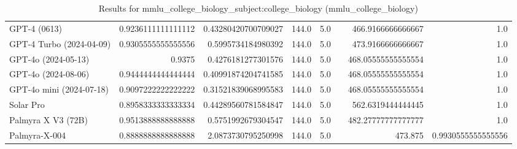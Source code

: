 \begin{table}[htp]
{\begin{tabular}{lrrrrrrr}
GPT-4 (0613) & 0.9236111111111112 & 0.43280420700709027 & 144.0 & 5.0 &  & 466.9166666666667 & 1.0 \\
GPT-4 Turbo (2024-04-09) & 0.9305555555555556 & 0.5995734184980392 & 144.0 & 5.0 &  & 473.9166666666667 & 1.0 \\
GPT-4o (2024-05-13) & 0.9375 & 0.4276181277301576 & 144.0 & 5.0 &  & 468.05555555555554 & 1.0 \\
GPT-4o (2024-08-06) & 0.9444444444444444 & 0.40991874204741585 & 144.0 & 5.0 &  & 468.05555555555554 & 1.0 \\
GPT-4o mini (2024-07-18) & 0.9097222222222222 & 0.31521839068995583 & 144.0 & 5.0 &  & 468.05555555555554 & 1.0 \\
Solar Pro & 0.8958333333333334 & 0.44289560781584847 & 144.0 & 5.0 &  & 562.6319444444445 & 1.0 \\
Palmyra X V3 (72B) & 0.9513888888888888 & 0.5751992679304547 & 144.0 & 5.0 &  & 482.27777777777777 & 1.0 \\
Palmyra-X-004 & 0.8888888888888888 & 2.0873730795250998 & 144.0 & 5.0 &  & 473.875 & 0.9930555555555556 \\
\bottomrule
\end{tabular}}
\caption{Results for mmlu_college_biology_subject:college_biology (mmlu_college_biology)}
\label{fig:mmlu_college_biology_subject:college_biology (mmlu_college_biology)}
\end{table}
